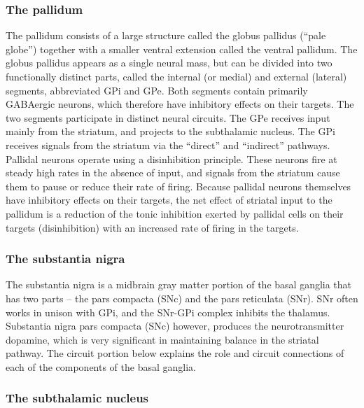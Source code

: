 \hypertarget{the-pallidum}{%
\subsubsection{The pallidum}\label{the-pallidum}}

The pallidum consists of a large structure called the globus pallidus (``pale globe'') together with a smaller ventral extension called the ventral pallidum. The globus pallidus appears as a single neural mass, but can be divided into two functionally distinct parts, called the internal (or medial) and external (lateral) segments, abbreviated GPi and GPe. Both segments contain primarily GABAergic neurons, which therefore have inhibitory effects on their targets. The two segments participate in distinct neural circuits. The GPe receives input mainly from the striatum, and projects to the subthalamic nucleus. The GPi receives signals from the striatum via the ``direct'' and ``indirect'' pathways. Pallidal neurons operate using a disinhibition principle. These neurons fire at steady high rates in the absence of input, and signals from the striatum cause them to pause or reduce their rate of firing. Because pallidal neurons themselves have inhibitory effects on their targets, the net effect of striatal input to the pallidum is a reduction of the tonic inhibition exerted by pallidal cells on their targets (disinhibition) with an increased rate of firing in the targets.

\hypertarget{the-substantia-nigra}{%
\subsubsection{The substantia nigra}\label{the-substantia-nigra}}

The substantia nigra is a midbrain gray matter portion of the basal ganglia that has two parts -- the pars compacta (SNc) and the pars reticulata (SNr). SNr often works in unison with GPi, and the SNr-GPi complex inhibits the thalamus. Substantia nigra pars compacta (SNc) however, produces the neurotransmitter dopamine, which is very significant in maintaining balance in the striatal pathway. The circuit portion below explains the role and circuit connections of each of the components of the basal ganglia.

\hypertarget{the-subthalamic-nucleus}{%
\subsubsection{The subthalamic nucleus}\label{the-subthalamic-nucleus}}

